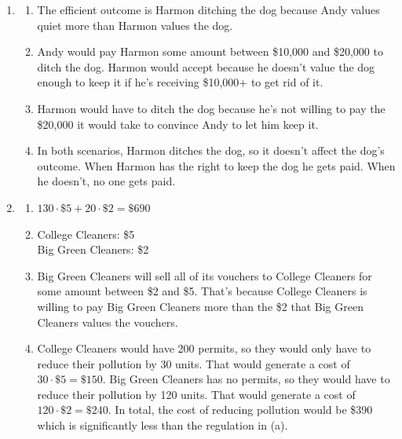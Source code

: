 \documentclass{article}
\begin{document}
\begin{enumerate}
\begin{enumerate}
	\end{enumerate}
	
\item

	\begin{enumerate}
	
	\item The efficient outcome is Harmon ditching the dog because Andy values quiet more than Harmon values the dog.
	
	\item Andy would pay Harmon some amount between \$10,000 and \$20,000 to ditch the dog. Harmon would accept because he doesn't value the dog enough to keep it if he's receiving \$10,000+ to get rid of it. 
	
	\item Harmon would have to ditch the dog because he's not willing to pay the \$20,000 it would take to convince Andy to let him keep it.
	
	\item In both scenarios, Harmon ditches the dog, so it doesn't affect the dog's outcome. When Harmon has the right to keep the dog he gets paid. When he doesn't, no one gets paid.
	
	\end{enumerate}
	
\item

	\begin{enumerate}
	
	\item $130 \cdot \$5 + 20 \cdot \$2 = \$690$
	
	\item College Cleaners: \$5 \\
		Big Green Cleaners: \$2
		
	\item Big Green Cleaners will sell all of its vouchers to College Cleaners for some amount between \$2 and \$5. That's because College Cleaners is willing to pay Big Green Cleaners more than the \$2 that Big Green Cleaners values the vouchers.
	
	\item College Cleaners would have 200 permits, so they would only have to reduce their pollution by 30 units. That would generate a cost of $30 \cdot \$5 = \$150$. Big Green Cleaners has no permits, so they would have to reduce their pollution by 120 units. That would generate a cost of $120 \cdot \$2 = \$240$. In total, the cost of reducing pollution would be \$390 which is significantly less than the regulation in (a).
	
	\end{enumerate}

\end{enumerate}
\end{document}
